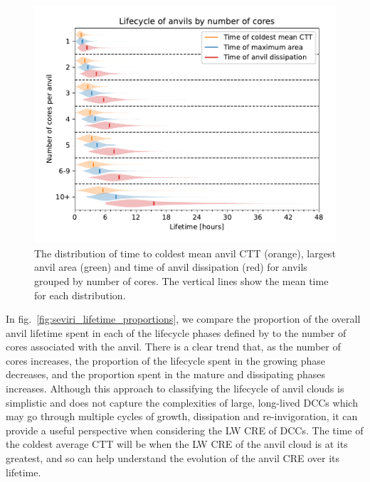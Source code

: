 \documentclass[acp, manuscript]{copernicus}
\begin{document}
\begin{figure}[tp]
    \includegraphics[width=12cm]{figures/fig08.pdf}
    \caption[
    The distribution of time to coldest mean anvil CTT, largest anvil area and time of anvil dissipation
    ]{
    The distribution of time to coldest mean anvil CTT (orange), largest anvil area (green) and time of anvil dissipation (red) for anvils grouped by number of cores. The vertical lines show the mean time for each distribution.
    }
    \label{fig:seviri_lifetime_dists}
\end{figure}


In fig.~\ref{fig:seviri_lifetime_proportions}, we compare the proportion of the overall anvil lifetime spent in each of the lifecycle phases defined by \citet{futyan_deep_2007} to the number of cores associated with the anvil. 
There is a clear trend that, as the number of cores increases, the proportion of the lifecycle spent in the growing phase decreases, and the proportion spent in the mature and dissipating phases increases.
 Although this approach to classifying the lifecycle of anvil clouds is simplistic and does not capture the complexities of large, long-lived DCCs which may go through multiple cycles of growth, dissipation and re-invigoration, it can provide a useful perspective when considering the LW CRE of DCCs. 
 The time of the coldest average CTT will be when the LW CRE of the anvil cloud is at its greatest, and so can help understand the evolution of the anvil CRE over its lifetime.
\end{document}
